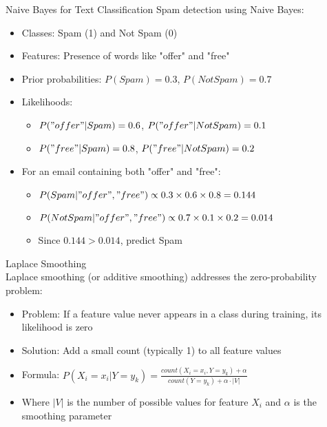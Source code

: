 \begin{example}{Naive Bayes for Text Classification}
Spam detection using Naive Bayes:
\begin{itemize}
    \item Classes: Spam (1) and Not Spam (0)
    \item Features: Presence of words like "offer" and "free"
    \item Prior probabilities: $P(Spam) = 0.3$, $P(NotSpam) = 0.7$
    \item Likelihoods: 
    \begin{itemize}
        \item $P("offer"|Spam) = 0.6$, $P("offer"|NotSpam) = 0.1$
        \item $P("free"|Spam) = 0.8$, $P("free"|NotSpam) = 0.2$
    \end{itemize}
    \item For an email containing both "offer" and "free":
    \begin{itemize}
        \item $P(Spam|"offer","free") \propto 0.3 \times 0.6 \times 0.8 = 0.144$
        \item $P(NotSpam|"offer","free") \propto 0.7 \times 0.1 \times 0.2 = 0.014$
        \item Since $0.144 > 0.014$, predict Spam
    \end{itemize}
\end{itemize}
\end{example}

\begin{concept}{Laplace Smoothing}\\
Laplace smoothing (or additive smoothing) addresses the zero-probability problem:
\begin{itemize}
    \item Problem: If a feature value never appears in a class during training, its likelihood is zero
    \item Solution: Add a small count (typically 1) to all feature values
    \item Formula: $P(X_i=x_i|Y=y_k) = \frac{count(X_i=x_i, Y=y_k) + \alpha}{count(Y=y_k) + \alpha \cdot |V|}$
    \item Where $|V|$ is the number of possible values for feature $X_i$ and $\alpha$ is the smoothing parameter
\end{itemize}
\end{concept}

